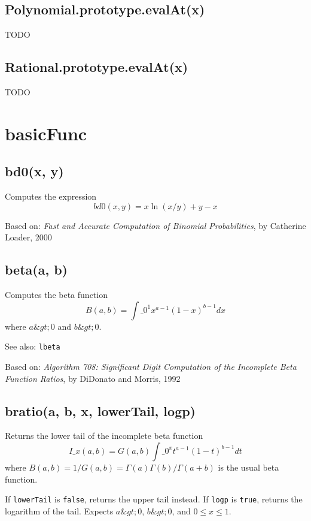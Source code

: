 \documentclass{article}
\begin{document}
    \subsection*{Polynomial.prototype.evalAt(x)}
    TODO


    \subsection*{Rational.prototype.evalAt(x)}
    TODO


  \section{basicFunc}
    \subsection*{bd0(x, y)}
    Computes the expression $$bd0(x, y) = x \ln(x/y) + y - x$$


Based on:  \emph{Fast and Accurate Computation of Binomial Probabilities},
by Catherine Loader, 2000


    \subsection*{beta(a, b)}
    Computes the beta function
$$B(a,b) = \int\_0^1 x^{a-1} (1-x)^{b-1} dx$$ where $a\&gt;0$ and $b\&gt;0$.


See also: \texttt{lbeta}


Based on: \emph{Algorithm 708: Significant Digit Computation of the Incomplete Beta Function
Ratios}, by DiDonato and Morris, 1992


    \subsection*{bratio(a, b, x, lowerTail, logp)}
    Returns the lower tail of the incomplete beta function
$$I\_x(a, b)=G(a,b)\int\_0^xt^{a-1}(1-t)^{b-1}dt$$
where $B(a,b)=1/G(a,b) = \Gamma(a)\Gamma(b)/\Gamma(a+b)$ is the
usual beta function.


If \texttt{lowerTail} is \texttt{false}, returns the upper tail instead.
If \texttt{logp} is \texttt{true}, returns the logarithm of the tail.
Expects $a\&gt;0$, $b\&gt;0$, and $0 \leq x \leq 1$.
\end{document}
